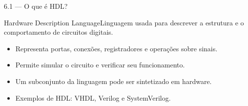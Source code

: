 \begin{frame}[t]{6.1 — O que é HDL?}
\begin{block}{Hardware Description Language}Linguagem usada para descrever a estrutura e o comportamento de circuitos digitais.\end{block}\begin{itemize}
\item Representa portas, conexões, registradores e operações sobre sinais.
\item Permite simular o circuito e verificar seu funcionamento.
\item Um subconjunto da linguagem pode ser sintetizado em hardware.
\item Exemplos de HDL: VHDL, Verilog e SystemVerilog.
\end{itemize}
\end{frame}
